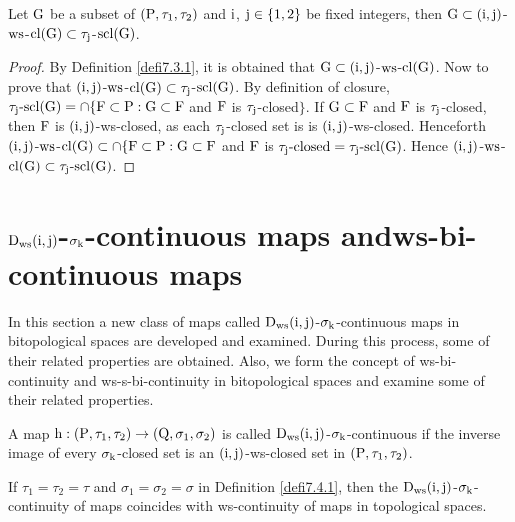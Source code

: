 \begin{thm}\label{thm7.3.5}
Let $\mathrm{G}$ be a subset of $(\mathrm{P}, \tau_1, \tau_2 )$ and $\mathrm{i}$, $\mathrm{j}\in\{1, 2\}$ be fixed integers, then $\mathrm{G} \subset (\mathrm{i}, \mathrm{j})$-$\mathrm{ws}$-$\mathrm{cl}(\mathrm{G}) \subset \tau_{\mathrm{j}}$-$\mathrm{scl}(\mathrm{G})$.
\end{thm}

\begin{proof}
By Definition \ref{defi7.3.1}, it is obtained that $\mathrm{G} \subset (\mathrm{i}, \mathrm{j})$-$\mathrm{ws}$-$\mathrm{cl}(\mathrm{G})$. Now to prove that $(\mathrm{i}, \mathrm{j})$-$\mathrm{ws}$-$\mathrm{cl}(\mathrm{G}) \subset \tau_{\mathrm{j}}$-$\mathrm{scl}(\mathrm{G})$. By definition of closure, $\tau_{\mathrm{j}}\text{-scl}(\mathrm{G})=\cap \{\mathrm{F}\subset\mathrm{P}: \mathrm{G}\subset\mathrm{F}$ and $\mathrm{F}$ is $\tau_{\mathrm{j}}$-closed$\}$. If $\mathrm{G} \subset \mathrm{F}$ and $\mathrm{F}$ is $\tau_{\mathrm{j}}$-closed, then $\mathrm{F}$ is $(\mathrm{i}, \mathrm{j})$-ws-closed, as each $\tau_{\mathrm{j}}$-closed set is is $(\mathrm{i}, \mathrm{j})$-ws-closed. Henceforth $(\mathrm{i}, \mathrm{j})$-$\mathrm{ws}$-$\mathrm{cl}(\mathrm{G}) \subset \cap \{\mathrm{F}\subset\mathrm{P}: \mathrm{G}\subset \mathrm{F}$ and $\mathrm{F}$ is $\tau_{\mathrm{j}}\text{-closed}= \tau_{\mathrm{j}}\text{-scl}(\mathrm{G})$. Hence $(\mathrm{i}, \mathrm{j})$-$\mathrm{ws}$-$\mathrm{cl}(\mathrm{G})\subset \tau_{\mathrm{j}}\text{-scl}(\mathrm{G})$.
\end{proof}

\section{\boldmath$\mathrm{D}_{\mathrm{ws}} (\mathrm{i}, \mathrm{j})$-$\sigma_{\mathrm{k}}$-continuous maps and\hfill\break ws-bi-conti\-nuous maps}

In this section a new class of maps called $\mathrm{D}_{\mathrm{ws}} (\mathrm{i}, \mathrm{j})$-$\sigma_{\mathrm{k}}$-continuous maps in bitopological spaces are developed and examined. During this process, some of their related properties are obtained. Also, we form the concept of ws-bi-continuity and ws-s-bi-continuity in bitopological spaces and examine some of their related properties.

\begin{dfn}\label{defi7.4.1}
A map $\mathrm{h}: (\mathrm{P}, \tau_1, \tau_2 )\to (\mathrm{Q}, \sigma_{1}, \sigma_{2} )$ is called $\mathrm{D}_{\mathrm{ws}} (\mathrm{i}, \mathrm{j})$-$\sigma_{\mathrm{k}}$-continuous if the inverse image of every $\sigma_{\mathrm{k}}$-closed set is an $(\mathrm{i}, \mathrm{j})$-ws-closed set in $(\mathrm{P}, \tau_1, \tau_2 )$.
\end{dfn}

\begin{rem}\label{rem7.4.2}
If $\tau_1 =\tau_2 =\tau$ and $\sigma_{1} =\sigma_{2} =\sigma$  in Definition \ref{defi7.4.1}, then the $\mathrm{D}_{\mathrm{ws}} (\mathrm{i}, \mathrm{j})$-$\sigma_{\mathrm{k}}$-continuity of maps coincides with ws-continuity of maps in topological spaces.
\end{rem}

